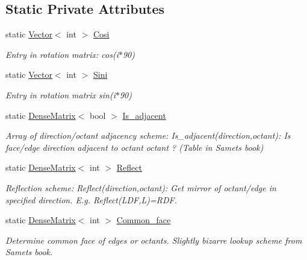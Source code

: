 \subsection*{Static Private Attributes}
\begin{DoxyCompactItemize}
\item 
static \hyperlink{classoomph_1_1Vector}{Vector}$<$ int $>$ \hyperlink{classoomph_1_1OcTree_aa9c70aef8a78008e8fa668c5e0e516d9}{Cosi}
\begin{DoxyCompactList}\small\item\em Entry in rotation matrix\+: cos(i$\ast$90) \end{DoxyCompactList}\item 
static \hyperlink{classoomph_1_1Vector}{Vector}$<$ int $>$ \hyperlink{classoomph_1_1OcTree_a5537d73ec80462fe6f03bdfd5ac836ff}{Sini}
\begin{DoxyCompactList}\small\item\em Entry in rotation matrix sin(i$\ast$90) \end{DoxyCompactList}\item 
static \hyperlink{classoomph_1_1DenseMatrix}{Dense\+Matrix}$<$ bool $>$ \hyperlink{classoomph_1_1OcTree_a24e29b9da2bf17cc81d803af6925890b}{Is\+\_\+adjacent}
\begin{DoxyCompactList}\small\item\em Array of direction/octant adjacency scheme\+: Is\+\_\+adjacent(direction,octant)\+: Is face/edge {\ttfamily direction} adjacent to octant {\ttfamily octant} ? (Table in Samet\textquotesingle{}s book) \end{DoxyCompactList}\item 
static \hyperlink{classoomph_1_1DenseMatrix}{Dense\+Matrix}$<$ int $>$ \hyperlink{classoomph_1_1OcTree_aae2497ec31766ebf0541ff6f2bffa790}{Reflect}
\begin{DoxyCompactList}\small\item\em Reflection scheme\+: Reflect(direction,octant)\+: Get mirror of octant/edge in specified direction. E.\+g. Reflect(\+L\+D\+F,\+L)=R\+DF. \end{DoxyCompactList}\item 
static \hyperlink{classoomph_1_1DenseMatrix}{Dense\+Matrix}$<$ int $>$ \hyperlink{classoomph_1_1OcTree_a50a97dff32038087df0195dcf346405e}{Common\+\_\+face}
\begin{DoxyCompactList}\small\item\em Determine common face of edges or octants. Slightly bizarre lookup scheme from Samet\textquotesingle{}s book. \end{DoxyCompactList}\item 

\end{DoxyCompactItemize}
